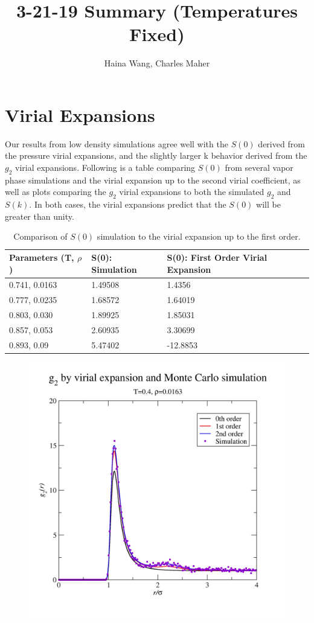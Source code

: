\documentclass[12pt]{article}
\title{3-21-19 Summary (Temperatures Fixed)}
\author{Haina Wang, Charles Maher}
\begin{document}
\maketitle

\section{Virial Expansions}

Our results from low density simulations agree well with the $S(0)$ derived from the pressure virial expansions, and the slightly larger k behavior derived from the $g_2$ virial expansions. Following is a table comparing $S(0)$ from several vapor phase simulations and the virial expansion up to the second virial coefficient, as well as plots comparing the $g_2$ virial expansions to both the simulated $g_2$ and $S(k)$. In both cases, the virial expansions predict that the $S(0)$ will be greater than unity. 
\begin{table}[H]
\centering
\caption{Comparison of $S(0)$ simulation to the virial expansion up to the first order.}
\begin{tabular}{|l|l|l|}
\hline
Parameters (T, $\rho$) & S(0): Simulation & S(0): First Order Virial Expansion \\ \hline
0.741, 0.0163        & 1.49508          & 1.4356                             \\ \hline
0.777, 0.0235        & 1.68572          & 1.64019                            \\ \hline
0.803, 0.030         & 1.89925          & 1.85031                            \\ \hline
0.857, 0.053         & 2.60935          & 3.30699                            \\ \hline
0.893, 0.09          & 5.47402          & -12.8853                           \\ \hline
\end{tabular}
\end{table}

\begin{figure}[H]
		\centering
		\includegraphics[width=0.7\linewidth]{g2rho0x0163t0x40}
		\label{fig:g2rho0x0163t0x40}
\end{figure}
\end{document}
